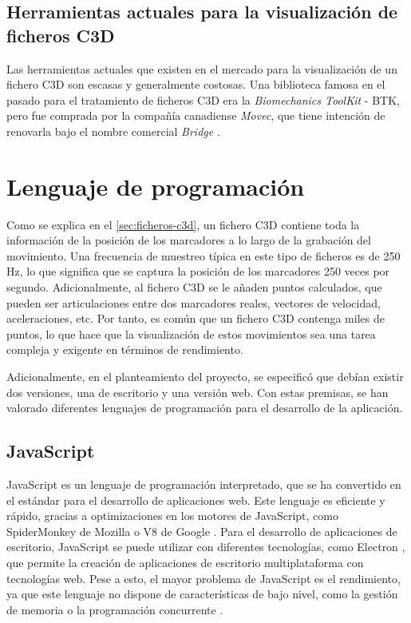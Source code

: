 \subsection{Herramientas actuales para la visualización de ficheros \acs{C3D}}

Las herramientas actuales que existen en el mercado para la visualización de un fichero \ac{C3D} son escasas y generalmente costosas. Una biblioteca famosa en el pasado para el tratamiento de ficheros \ac{C3D} era la \textit{Biomechanics ToolKit} - BTK, pero fue comprada por la compañía canadiense \textit{Movec}, que tiene intención de renovarla bajo el nombre comercial \textit{Bridge} \autocite{Bridge,ProjectBiomechanicalToolKit}.

\section{Lenguaje de programación}

Como se explica en el \autoref{sec:ficheros-c3d}, un fichero \ac{C3D} contiene toda la información de la posición de los marcadores a lo largo de la grabación del movimiento. Una frecuencia de muestreo típica en este tipo de ficheros es de 250 Hz, lo que significa que se captura la posición de los marcadores 250 veces por segundo. Adicionalmente, al fichero \ac{C3D} se le añaden puntos calculados, que pueden ser articulaciones entre dos marcadores reales, vectores de velocidad, aceleraciones, etc. Por tanto, es común que un fichero \ac{C3D} contenga miles de puntos, lo que hace que la visualización de estos movimientos sea una tarea compleja y exigente en términos de rendimiento.  

Adicionalmente, en el planteamiento del proyecto, se especificó que debían existir dos versiones, una de escritorio y una versión web. Con estas premisas, se han valorado diferentes lenguajes de programación para el desarrollo de la aplicación.  

\subsection{JavaScript}
JavaScript es un lenguaje de programación interpretado, que se ha convertido en el estándar para el desarrollo de aplicaciones web. Este lenguaje es eficiente y rápido, gracias a optimizaciones en los motores de JavaScript, como SpiderMonkey de Mozilla o V8 de Google \autocite{srinetChromeV8Firefox2022}. Para el desarrollo de aplicaciones de escritorio, JavaScript se puede utilizar con diferentes tecnologías, como Electron \autocite{BuildCrossplatformDesktop}, que permite la creación de aplicaciones de escritorio multiplataforma con tecnologías web. Pese a esto, el mayor problema de JavaScript es el rendimiento, ya que este lenguaje no dispone de características de bajo nivel, como la gestión de memoria o la programación concurrente \autocite{MemoryManagementJavaScript2025,pengMultithreadingJavascript2017}.

